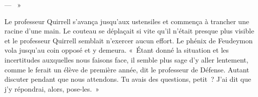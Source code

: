 --- ~»

Le professeur Quirrell s'avança jusqu'aux ustensiles et commença à trancher une racine d'une main.
Le couteau se déplaçait si vite qu'il n'était presque plus visible et le professeur Quirrell semblait n'exercer aucun effort.
Le phénix de Feudeymon vola jusqu'au coin opposé et y demeura.
«~Étant donné la situation et les incertitudes auxquelles nous faisons face, il semble plus sage d'y aller lentement, comme le ferait un élève de première année, dit le professeur de Défense.
Autant discuter pendant que nous attendons.
Tu avais des questions, petit~?
J'ai dit que j'y répondrai, alors, pose-les.~»
